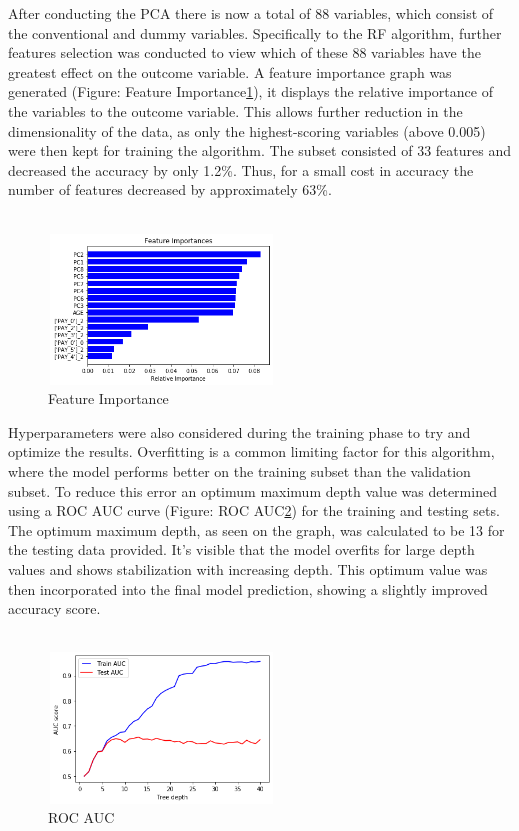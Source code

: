 \documentclass{article}
\begin{document}
After conducting the PCA there is now a total of 88 variables, which consist of the conventional and dummy variables. Specifically to the RF algorithm, further features selection was conducted to view which of these 88 variables have the greatest effect on the outcome variable. A feature importance graph  was generated (Figure: Feature Importance\ref{fig:feature-Importance}), it displays the relative importance of the variables to the outcome variable. This allows further reduction in the dimensionality of the data, as only the highest-scoring variables (above 0.005) were then kept for training the algorithm. The subset consisted of 33 features and decreased the accuracy by only 1.2\%. Thus, for a small cost in accuracy the number of features decreased by approximately 63\%.\\ \\
\begin{figure}[h]
 \centering
 \includegraphics[width=6cm, height=4cm]{feature-importance.png}
 \caption{Feature Importance}
 \label{fig:feature-Importance}
\end{figure}

Hyperparameters were also considered during the training phase to try and optimize the results\cite{rf-result}. Overfitting is a common limiting factor for this algorithm, where the model performs better on the training subset than the validation subset. To reduce this error an optimum maximum depth value was determined using a ROC AUC curve (Figure: ROC AUC\ref{fig:rf-auc}) for the training and testing sets\cite{rf-testing}. The optimum maximum depth, as seen on the graph, was calculated to be 13 for the testing data provided. It’s visible that the model overfits for large depth values and shows stabilization with increasing depth. This optimum value was then incorporated into the final model prediction, showing a slightly improved accuracy score.\\ \\
\begin{figure}[h]
 \centering
 \includegraphics[width=6cm, height=4cm]{rf-auc.png}
 \caption{ROC AUC}
 \label{fig:rf-auc}
\end{figure}
\end{document}
